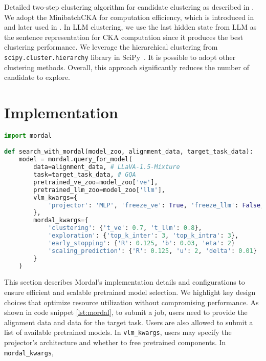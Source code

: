 Detailed two-step clustering algorithm for candidate clustering as described in . We adopt the MinibatchCKA for computation efficiency, which is introduced in \cite{nguyen2020wide} and later used in \cite{raghu2021vision}. In LLM clustering,  we use the last hidden state from LLM as the sentence representation for CKA computation since it produces the best clustering performance. We leverage the hierarchical clustering from \texttt{scipy.cluster.hierarchy} library in SciPy~\cite{2020SciPy-NMeth}. It is possible to adopt other clustering methods. Overall, this approach significantly reduces the number of candidate to explore.

\section{Implementation}

\begin{lstlisting}[language=Python, caption={Mordal interface}, label={lst:mordal}, float=h]
import mordal

def search_with_mordal(model_zoo, alignment_data, target_task_data):
    model = mordal.query_for_model(
        data=alignment_data, # LLaVA-1.5-Mixture
        task=target_task_data, # GQA
        pretrained_ve_zoo=model_zoo['ve'],
        pretrained_llm_zoo=model_zoo['llm'],
        vlm_kwargs={ 
            'projector': 'MLP', 'freeze_ve': True, 'freeze_llm': False,
        },
        mordal_kwargs={
            'clustering': {'t_ve': 0.7, 't_llm': 0.8}, 
            'exploration': {'top_k_inter': 3, 'top_k_intra': 3},
            'early_stopping': {'R': 0.125, 'b': 0.03, 'eta': 2}
            'scaling_prediction': {'R': 0.125, 'u': 2, 'delta': 0.01}
        }
    )
\end{lstlisting}

This section describes Mordal's implementation details and configurations to ensure efficient and scalable pretrained model selection. We highlight key design choices that optimize resource utilization without compromising performance. As shown in code snippet \cref{lst:mordal}, to submit a job, users need to provide the alignment data and data for the target task. Users are also allowed to submit a list of available pretrained models. In \texttt{vlm\_kwargs}, users may specify the projector's architecture and whether to free pretrained components. In \texttt{mordal\_kwargs},  


